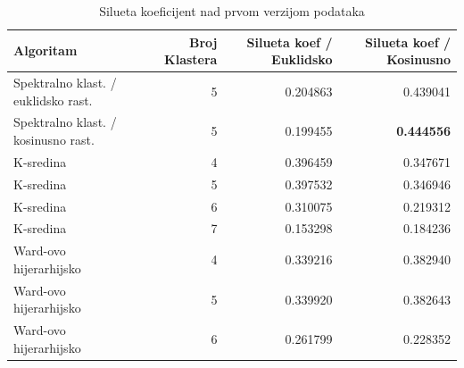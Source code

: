 \documentclass[a4paper]{article}
\begin{document}
\begin{center}
\begin{table}[H]
\caption{Silueta koeficijent nad prvom verzijom podataka}
\begin{adjustbox}{width=1\textwidth}
\begin{tabular}{lrrr}
\toprule
                           Algoritam &  Broj Klastera &  Silueta koef / Euklidsko &  Silueta koef / Kosinusno \\
\midrule
 Spektralno klast. / euklidsko rast. &              5 &                  0.204863 &                  0.439041 \\
 Spektralno klast. / kosinusno rast. &              5 &                  0.199455 &                 \textbf{0.444556}  \\
                           K-sredina &              4 &                  0.396459 &                  0.347671 \\
                           K-sredina &              5 &                  0.397532 &                  0.346946 \\
                           K-sredina &              6 &                  0.310075 &                  0.219312 \\
                           K-sredina &              7 &                  0.153298 &                  0.184236 \\
              Ward-ovo hijerarhijsko &              4 &                  0.339216 &                  0.382940 \\
              Ward-ovo hijerarhijsko &              5 &                  0.339920 &                  0.382643 \\
              Ward-ovo hijerarhijsko &              6 &                  0.261799 &                  0.228352 \\
\bottomrule
\end{tabular}
\end{adjustbox}
\label{grp1_v1_sil}
\end{table}
\end{center}
\end{document}
